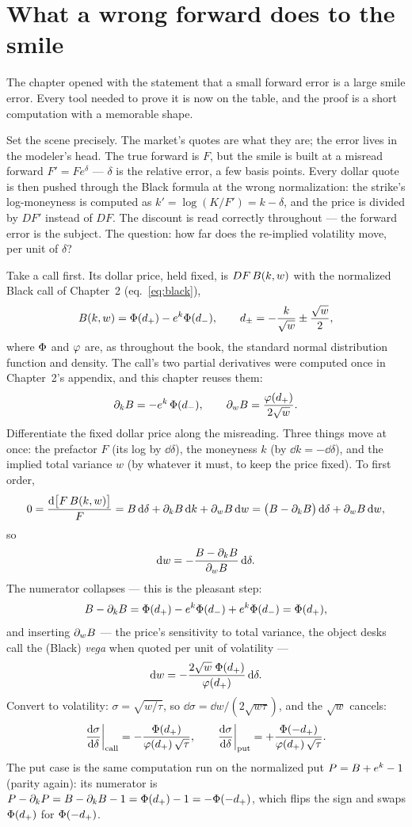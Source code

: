 \section{What a wrong forward does to the smile}
\label{sec:fwdskew}

The chapter opened with the statement that a small forward error is a
large smile error.  Every tool needed to prove it is now on the
table, and the proof is a short computation with a memorable shape.

Set the scene precisely.  The market's quotes are what they are; the
error lives in the modeler's head.  The true forward is $F$, but the
smile is built at a misread forward $F'=Fe^{\delta}$ --- $\delta$ is
the relative error, a few basis points.  Every dollar quote is then
pushed through the Black formula at the wrong normalization: the
strike's log-moneyness is computed as $k'=\log(K/F')=k-\delta$, and
the price is divided by $DF'$ instead of $DF$.  The discount is read
correctly throughout --- the forward error is the subject.  The
question: how far does the re-implied volatility move, per unit of
$\delta$?

Take a call first.  Its dollar price, held fixed, is
$DF\,B(k,w)$ with the normalized Black call of Chapter~2
(eq.~\ref{eq:black}),
\[
B(k,w)=\Phi(d_+)-e^k\Phi(d_-),
\qquad
d_\pm=-\frac{k}{\sqrt w}\pm\frac{\sqrt w}{2},
\]
where $\Phi$ and $\varphi$ are, as throughout the book, the standard
normal distribution function and density.  The call's two partial
derivatives were computed once in Chapter~2's appendix, and this
chapter reuses them:
\[
\partial_kB=-e^k\,\Phi(d_-),
\qquad
\partial_wB=\frac{\varphi(d_+)}{2\sqrt w}.
\]
Differentiate the fixed dollar price along the misreading.  Three
things move at once: the prefactor $F$ (its log by $\dd\delta$), the
moneyness $k$ (by $\dd k=-\dd\delta$), and the implied total variance
$w$ (by whatever it must, to keep the price fixed).  To first order,
\[
0=\frac{\mathrm{d}\big[F\,B(k,w)\big]}{F}
=B\,\mathrm{d}\delta
+\partial_kB\,\mathrm{d} k
+\partial_wB\,\mathrm{d} w
=\big(B-\partial_kB\big)\,\mathrm{d}\delta
+\partial_wB\,\mathrm{d} w ,
\]
so
\[
\mathrm{d} w
=-\frac{B-\partial_kB}{\partial_wB}\,\mathrm{d}\delta .
\]
The numerator collapses --- this is the pleasant step:
\[
B-\partial_kB
=\Phi(d_+)-e^k\Phi(d_-)+e^k\Phi(d_-)
=\Phi(d_+),
\]
and inserting $\partial_wB$ --- the price's sensitivity to
total variance, the object desks call the (Black) \emph{vega} when
quoted per unit of volatility ---
\[
\mathrm{d} w=-\frac{2\sqrt w\;\Phi(d_+)}{\varphi(d_+)}\,\mathrm{d}\delta .
\]
Convert to volatility: $\sigma=\sqrt{w/\tau}$, so
$\dd\sigma=\dd w/(2\sqrt{w\tau})$, and the $\sqrt w$ cancels:
\begin{equation}
\frac{\mathrm{d}\sigma}{\mathrm{d}\delta}\bigg|_{\text{call}}
=-\frac{\Phi(d_+)}{\varphi(d_+)\,\sqrt\tau},
\qquad
\frac{\mathrm{d}\sigma}{\mathrm{d}\delta}\bigg|_{\text{put}}
=+\frac{\Phi(-d_+)}{\varphi(d_+)\,\sqrt\tau}.
\label{eq:fwddsig}
\end{equation}
The put case is the same computation run on the normalized put
$P=B+e^k-1$ (parity again): its numerator is
$P-\partial_kP=B-\partial_kB-1=\Phi(d_+)-1=-\Phi(-d_+)$,
which flips the sign and swaps $\Phi(d_+)$ for $\Phi(-d_+)$.

